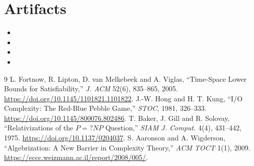 \documentclass[11pt]{article}
\begin{document}
\section{Artifacts}
\begin{itemize}
\item {}
\item {}
\item {}
\item {}
\end{itemize}

\begin{thebibliography}{9}
 L. Fortnow, R. Lipton, D. van Melkebeek and A. Viglas,
``Time-Space Lower Bounds for Satisfiability,'' \emph{J. ACM} 52(6),
835--865, 2005. \url{https://doi.org/10.1145/1101821.1101822}.
 J.-W. Hong and H. T. Kung,
``I/O Complexity: The Red-Blue Pebble Game,'' \emph{STOC}, 1981,
326--333. \url{https://doi.org/10.1145/800076.802486}.
 T. Baker, J. Gill and R. Solovay,
``Relativizations of the $P=?NP$ Question,'' \emph{SIAM J. Comput.} 4(4),
431--442, 1975. \url{https://doi.org/10.1137/0204037}.
 S. Aaronson and A. Wigderson, ``Algebrization: A New Barrier
in Complexity Theory,'' \emph{ACM TOCT} 1(1), 2009.
\url{https://eccc.weizmann.ac.il/report/2008/005/}.
\end{thebibliography}

\end{document}
